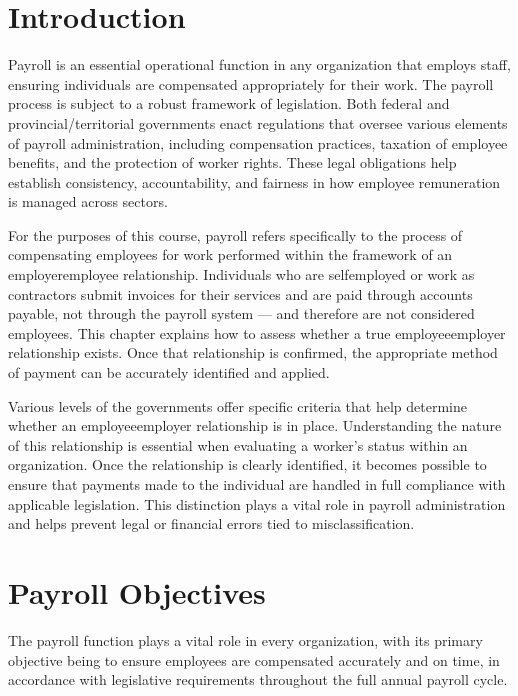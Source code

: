 \documentclass[letterpaper,10pt,english]{sphinxmanual}
\begin{document}
\section{Introduction}
\label{\detokenize{compliance:introduction}}
\sphinxAtStartPar
Payroll is an essential operational function in any organization that employs staff, ensuring individuals are compensated
appropriately for their work. The payroll process is subject to a robust framework of legislation. Both federal and
provincial/territorial governments enact regulations that oversee various elements of payroll administration,
including compensation practices, taxation of employee benefits, and the protection of worker rights. These legal obligations
help establish consistency, accountability, and fairness in how employee remuneration is managed across sectors.

\sphinxAtStartPar
For the purposes of this course, payroll refers specifically to the process of compensating employees for work performed
within the framework of an employer\sphinxhyphen{}employee relationship. Individuals who are self\sphinxhyphen{}employed or work as contractors submit
invoices for their services and are paid through accounts payable, not through the payroll system — and therefore are not
considered employees. This chapter explains how to assess whether a true employee\sphinxhyphen{}employer relationship exists. Once that
relationship is confirmed, the appropriate method of payment can be accurately identified and applied.

\sphinxAtStartPar
Various levels of the governments offer specific criteria that help determine whether an employee\sphinxhyphen{}employer
relationship is in place. Understanding the nature of this relationship is essential when evaluating a worker’s status within
an organization. Once the relationship is clearly identified, it becomes possible to ensure that payments made to the
individual are handled in full compliance with applicable legislation. This distinction plays a vital role in payroll
administration and helps prevent legal or financial errors tied to misclassification.


\section{Payroll Objectives}
\label{\detokenize{compliance:payroll-objectives}}
\sphinxAtStartPar
The payroll function plays a vital role in every organization, with its primary objective being to ensure employees are
compensated accurately and on time, in accordance with legislative requirements throughout the full annual payroll cycle.
\end{document}
